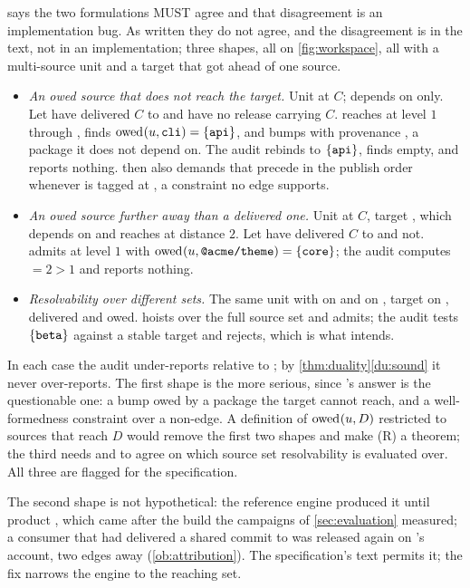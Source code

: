 \begin{remark}
\label{rem:owed-reach}
 says the two formulations MUST agree and that disagreement is an
implementation bug. As written they do not agree, and the disagreement is in
the text, not in an implementation; three shapes, all on \cref{fig:workspace},
all with a multi-source unit and a target that got ahead of one source.
\begin{itemize}
  \item \emph{An owed source that does not reach the target.} Unit
     at $C$;  depends on 
    only. Let  have delivered $C$ to  and  have no
    release carrying $C$.  reaches  at level $1$ through
    , finds $\mathrm{owed}_{}(u,\texttt{cli}) = \{\texttt{api}\}$, and bumps
     with provenance , a package it does not depend on.
    The audit rebinds  to $\{\texttt{api}\}$, finds
     empty, and reports nothing.  then also demands
    that  precede  in the publish order whenever
     is tagged at \Head{}, a constraint no edge supports.
  \item \emph{An owed source further away than a delivered one.} Unit
     at $C$, target , which
    depends on  and reaches  at distance $2$. Let
     have delivered $C$ to  and  not.
     admits at level $1$ with $\mathrm{owed}_{}(u,\texttt{@acme/theme}) =
    \{\texttt{core}\}$; the audit computes  $= 2 > 1$ and reports
    nothing.
  \item \emph{Resolvability over different sets.} The same unit with
     on \stable{} and  on , target
     on \stable{},  delivered and  owed.
     hoists  over the full source set and admits;
    the audit tests $\{\texttt{beta}\}$ against a stable target and rejects,
    which is what  intends.
\end{itemize}
In each case the audit under-reports relative to ; by
\cref{thm:duality}\ref{du:sound} it never over-reports. The first shape is the
more serious, since 's answer is the questionable one: a bump owed
by a package the target cannot reach, and a well-formedness constraint over a
non-edge. A definition of $\mathrm{owed}_{}(u,D)$ restricted to sources that reach $D$
would remove the first two shapes and make (R) a theorem; the third needs
 and  to agree on which source set resolvability is
evaluated over. All three are flagged for the specification.

The second shape is not hypothetical: the reference engine produced it until product  , which came after the build the campaigns of \cref{sec:evaluation} measured; a consumer that  had delivered a shared commit to was released again on 's account, two edges away (\cref{ob:attribution}). The specification's text permits it; the fix narrows the engine to the reaching set.
\end{remark}

